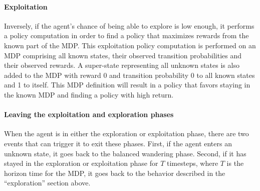 \paragraph{Exploitation}
Inversely, if the agent's chance of being able to explore is low enough, it performs a policy computation in order to find a policy that maximizes rewards from the known part of the MDP. This exploitation policy computation is performed on an MDP comprising all known states, their observed transition probabilities and their observed rewards. A super-state representing all unknown states is also added to the MDP with reward 0 and transition probability 0 to all known states and 1 to itself. This MDP definition will result in a policy that favors staying in the known MDP and finding a policy with high return.

\paragraph{Leaving the exploitation and exploration phases}
When the agent is in either the exploration or exploitation phase, there are two events that can trigger it to exit these phases. First, if the agent enters an unknown state, it goes back to the balanced wandering phase. Second, if it has stayed in the exploration or exploitation phase for $T$ timesteps, where $T$ is the horizon time for the MDP, it goes back to the behavior described in the ``exploration'' section above.

